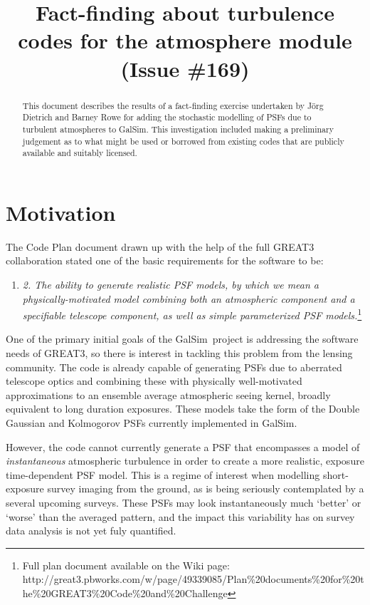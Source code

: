 \documentclass[preprint]{aastex}
\newcommand{\galsim}{{\sc GalSim}}
\begin{document}
\title{Fact-finding about turbulence codes for the atmosphere module (Issue \#169)}

\begin{abstract}
This document describes the results of a fact-finding exercise undertaken by J\"{o}rg Dietrich and 
Barney Rowe for adding the stochastic modelling of PSFs due to turbulent atmospheres to 
\galsim.  This investigation included making a preliminary judgement as to what might be used or 
borrowed from existing codes that are publicly available and suitably licensed.
\end{abstract}

\section{Motivation}
The Code Plan document drawn up with the help of the full GREAT3
collaboration stated one of the basic requirements for the software to be:
\begin{enumerate}
\item[] \emph{2. The ability to generate realistic PSF models, by which we mean
  a physically-motivated model combining both an atmospheric component
  and a specifiable telescope component, as well as simple
  parameterized PSF models.}\footnote{Full plan document available on
  the Wiki page: \newline http://great3.pbworks.com/w/page/49339085/Plan\%20documents\%20for\%20the\%20GREAT3\%20Code\%20and\%20Challenge}
\end{enumerate}
One of the primary initial goals of the \galsim\ project is addressing the
software needs of GREAT3, so there is interest in tackling this
problem from the lensing community.  The code is already capable of
generating PSFs due to aberrated telescope optics and combining these
with physically well-motivated approximations to an ensemble average atmospheric seeing
kernel, broadly equivalent to long duration
exposures.  These models take the form of the Double Gaussian and
Kolmogorov PSFs currently implemented in \galsim.

However, the code cannot currently generate a PSF that encompasses a
model of \emph{instantaneous} atmospheric turbulence in order to
create a more
realistic, exposure time-dependent PSF model.  This is a regime of
interest when modelling short-exposure survey imaging from the ground,
as is being seriously contemplated by a several upcoming surveys.
These PSFs may look instantaneously much `better' or `worse' than
the averaged pattern, and the impact this variability has on survey
data analysis is not yet fuly quantified.
\end{document}
